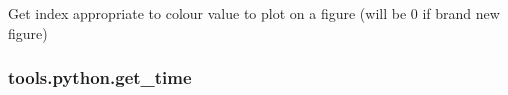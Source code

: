 \documentclass[letterpaper,10pt,english]{sphinxmanual}
\begin{document}
\begin{fulllineitems}
\label{\detokenize{_autosummary/tools.python.get_i_colour:tools.python.get_i_colour}}
\sphinxAtStartPar
Get index appropriate to colour value to plot on a figure (will be 0 if brand new figure)

\end{fulllineitems}



\subsubsection{tools.python.get\_time}
\label{\detokenize{_autosummary/tools.python.get_time:tools-python-get-time}}\label{\detokenize{_autosummary/tools.python.get_time::doc}}
\end{document}
